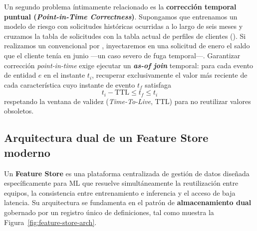 Un segundo problema íntimamente relacionado es la \textbf{corrección temporal puntual (\textit{Point-in-Time Correctness})}. Supongamos que entrenamos un modelo de riesgo con solicitudes históricas ocurridas a lo largo de seis meses y cruzamos la tabla de solicitudes con la tabla actual de perfiles de clientes (). Si realizamos un  convencional por , inyectaremos en una solicitud de enero el saldo que el cliente tenía en junio ---un caso severo de fuga temporal---. Garantizar corrección \textit{point-in-time} exige ejecutar un \textbf{\textit{as-of join}} temporal: para cada evento de entidad $e$ en el instante $t_i$, recuperar exclusivamente el valor más reciente de cada característica cuyo instante de evento $t_f$ satisfaga
\[
t_i - \text{TTL} \le t_f \le t_i
\]
respetando la ventana de validez (\textit{Time-To-Live}, TTL) para no reutilizar valores obsoletos.

\subsection{Arquitectura dual de un Feature Store moderno}

Un \textbf{Feature Store} es una plataforma centralizada de gestión de datos diseñada específicamente para ML que resuelve simultáneamente la reutilización entre equipos, la consistencia entre entrenamiento e inferencia y el acceso de baja latencia. Su arquitectura se fundamenta en el patrón de \textbf{almacenamiento dual} gobernado por un registro único de definiciones, tal como muestra la Figura~\ref{fig:feature-store-arch}.

